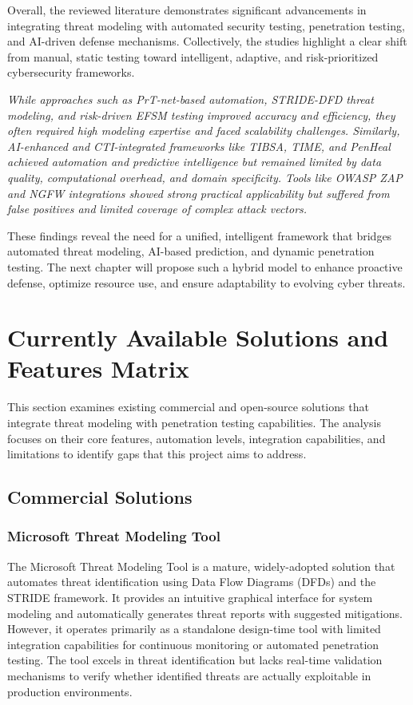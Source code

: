 Overall, the reviewed literature demonstrates significant advancements in integrating threat modeling with automated security testing, penetration testing, and AI-driven defense mechanisms. Collectively, the studies highlight a clear shift from manual, static testing toward intelligent, adaptive, and risk-prioritized cybersecurity frameworks.

\textit{While approaches such as PrT-net-based automation, STRIDE-DFD threat modeling, and risk-driven EFSM testing improved accuracy and efficiency, they often required high modeling expertise and faced scalability challenges. Similarly, AI-enhanced and CTI-integrated frameworks like TIBSA, TIME, and PenHeal achieved automation and predictive intelligence but remained limited by data quality, computational overhead, and domain specificity. Tools like OWASP ZAP and NGFW integrations showed strong practical applicability but suffered from false positives and limited coverage of complex attack vectors.}

These findings reveal the need for a unified, intelligent framework that bridges automated threat modeling, AI-based prediction, and dynamic penetration testing. The next chapter will propose such a hybrid model to enhance proactive defense, optimize resource use, and ensure adaptability to evolving cyber threats.

\section{Currently Available Solutions and Features Matrix}

This section examines existing commercial and open-source solutions that integrate threat modeling with penetration testing capabilities. The analysis focuses on their core features, automation levels, integration capabilities, and limitations to identify gaps that this project aims to address.

\subsection{Commercial Solutions}

\subsubsection{Microsoft Threat Modeling Tool}
The Microsoft Threat Modeling Tool is a mature, widely-adopted solution that automates threat identification using Data Flow Diagrams (DFDs) and the STRIDE framework. It provides an intuitive graphical interface for system modeling and automatically generates threat reports with suggested mitigations. However, it operates primarily as a standalone design-time tool with limited integration capabilities for continuous monitoring or automated penetration testing. The tool excels in threat identification but lacks real-time validation mechanisms to verify whether identified threats are actually exploitable in production environments.

